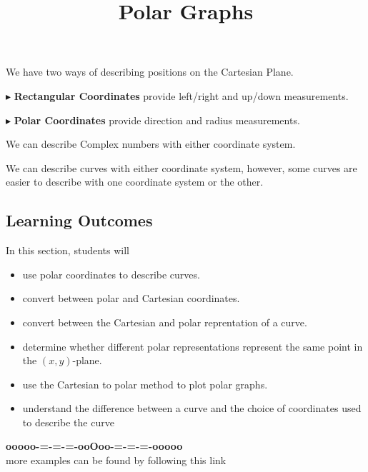 \documentclass{ximera}
\title{Polar Graphs}
\begin{document}
\begin{abstract}
\end{abstract}
\maketitle





We have two ways of describing positions on the Cartesian Plane.


$\blacktriangleright$ \textbf{Rectangular Coordinates} provide left/right and up/down measurements.





$\blacktriangleright$ \textbf{Polar Coordinates} provide direction and radius measurements.




We can describe Complex numbers with either coordinate system.


We can describe curves with either coordinate system, however, some curves are easier to describe with one coordinate system or the other.



\subsection*{Learning Outcomes}



\begin{sectionOutcomes}
In this section, students will 

\begin{itemize}
\item use polar coordinates to describe curves.
\item convert between polar and Cartesian coordinates.
\item convert between the Cartesian and polar reprentation of a curve.
\item determine whether different polar representations represent the same point in the $(x,y)$-plane.
\item use the Cartesian to polar method to plot polar graphs.
\item understand the difference between a curve and the choice of coordinates used to describe the curve
\end{itemize}
\end{sectionOutcomes}











\begin{center}
\textbf{\textcolor{green!50!black}{ooooo-=-=-=-ooOoo-=-=-=-ooooo}} \\

more examples can be found by following this link\\ 

\end{center}
\end{document}
